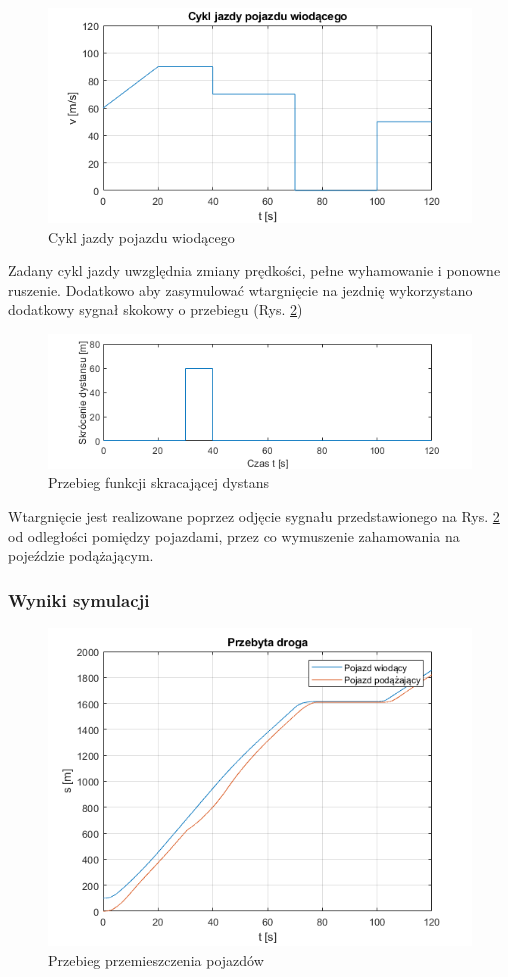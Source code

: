 \documentclass[12pt, a4paper, headings=normal]{article}
\begin{document}
\begin{figure}[H]
	\centering
	\includegraphics[width=.8\textwidth]{drvcycle.png}
	\caption{Cykl jazdy pojazdu wiodącego}
	\label{fig:drvc}
\end{figure}

Zadany cykl jazdy uwzględnia zmiany prędkości, pełne wyhamowanie i ponowne ruszenie.
Dodatkowo aby zasymulować wtargnięcie na jezdnię wykorzystano dodatkowy sygnał skokowy
o przebiegu (Rys. \ref{fig:dist_inter})

\begin{figure}[H]
	\centering
	\includegraphics[width=.8\textwidth]{distinterupt.png}
	\caption{Przebieg funkcji skracającej dystans}
	\label{fig:dist_inter}
\end{figure}

Wtargnięcie jest realizowane poprzez odjęcie sygnału przedstawionego na Rys. \ref{fig:dist_inter}
od odległości pomiędzy pojazdami, przez co wymuszenie zahamowania na pojeździe podążającym.

\subsubsection{Wyniki symulacji}

\begin{figure}[H]
	\centering
	\includegraphics[width=.8\textwidth]{dstdrv.png}
	\caption{Przebieg przemieszczenia pojazdów}
	\label{fig:dist_driven}
\end{figure}
\end{document}
